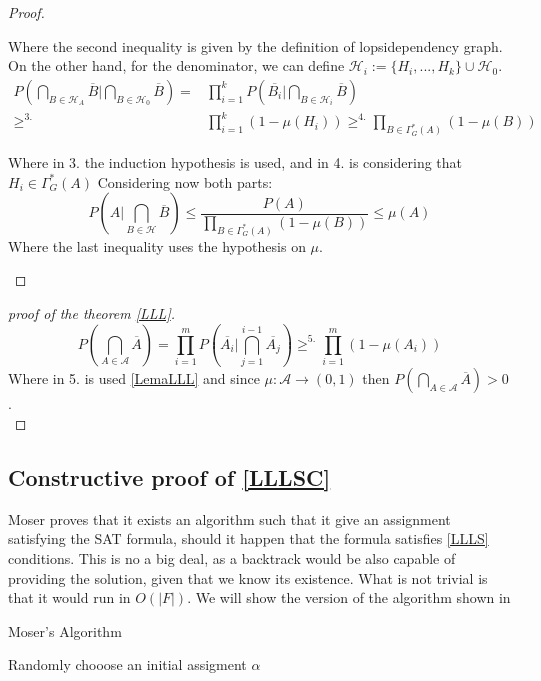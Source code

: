 \begin{proof}
\begin{itemize}
Where the second inequality is given by the definition of lopsidependency graph. On the other hand, for the denominator, we can define $\mathcal{H}_i := \{H_i,...,H_k\} \cup \mathcal{H}_0$.
\begin{align*}
P\left ( \bigcap_{B\in \mathcal{H}_A} \overline{B}  \Big| \bigcap_{B\in \mathcal{H}_0} \overline{B} \right )  = & \prod_{i=1}^k P\left ( \overline{B_i} \Big| \bigcap_{B\in \mathcal{H}_i} \overline{B} \right ) \\  \ge^{3.}  & \prod_{i=1}^k \left (1-\mu(H_i)\right ) 
 \ge^{4.}  \prod_{B\in\Gamma_G^*(A)} \left (1-\mu(B)\right )
\end{align*}

Where in 3. the induction hypothesis is used, and in 4. is considering  that $H_i \in \Gamma_G^*(A)$
Considering now both parts:
\[
P\left ( A \Big| \bigcap_{B\in \mathcal{H}} \overline{B} \right ) \le \frac{P(A)}{\prod_{B\in\Gamma_G^*(A)} \left (1-\mu(B)\right )} \le \mu(A)
\]
Where the last inequality uses the hypothesis on $\mu$.
\end{itemize}
\end{proof}


\begin{proof}[proof of the theorem \ref{LLL}]
\[
P\left ( \bigcap_{A\in \mathcal{A}} \overline{A}\right ) = \prod_{i=1}^m P \left( \overline{A_i} \Big | \bigcap_{j=1}^{i-1} \overline{A_j}\right) \ge^{5.} \prod_{i=1}^m ( 1 - \mu(A_i))
\]
	Where in 5. is used \ref{LemaLLL} and since $\mu:\mathcal{A}\to (0,1)$ then $P\left ( \bigcap_{A\in \mathcal{A}} \overline{A}\right )  > 0$.\\
\end{proof}


\subsection{Constructive proof of \ref{LLLSC}}

Moser\cite{moser2013exact} proves that it exists an algorithm such that it give an assignment satisfying the SAT formula, should it happen that the formula satisfies \ref{LLLS} conditions. This is no a big deal, as a backtrack would be also capable of providing the solution, given that we know its existence. What is not trivial is that it would run in $O(|F|)$. We will show the version of the algorithm shown in \cite{schoning2013satisfiability} 



\begin{algorithm}
\caption{Moser's Algorithm}\label{euclid}
\begin{algorithmic}[1]
  \State Randomly chooose an initial assigment $\alpha$
  
\EndProcedure
\end{algorithmic}
\end{algorithm}




